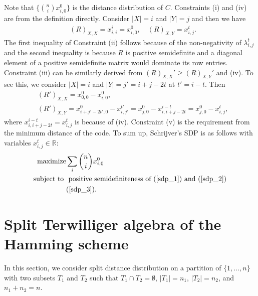 \documentclass[final,onecolumn]{IEEEtran}
\theoremstyle{definition}
\begin{document}
Note that $\{\binom{n}{i}x_{i, 0}^{0}\}$  is the distance distribution of $C$. Constraints (i) and (iv) are from the definition directly. Consider  $\lvert X \rvert = i$  and $\lvert Y \rvert = j$ and then we have
\begin{align*}
	&(R)_{X,X} = x_{i, i}^{i} = x_{i, 0}^{0}, \quad (R)_{X,Y} = x_{i, j}^{t}.
\end{align*}
The first inequality of Constraint  (ii) follows  because  of the non-negativity of $\lambda_{i,j}^t$ and the second inequality is because $R$ is positive semidefinite and a diagonal element of a positive semidefinite matrix would dominate its row entries.  Constraint (iii) can be similarly derived from $(R)_{X,X}'\geq (R)_{X,Y}'$ and (iv). To see this, we consider $\lvert X \rvert = i$ and $\lvert Y \rvert =j'= i+j-2t$ at $t'= i-t$. Then
\begin{align*}
	&  (R')_{X, X} = x_{0, 0}^{0} - x_{i, 0}^{0}, \\
	& (R')_{X, Y} = x_{i+j'-2t', 0}^{0} - x_{i, j'}^{t'}= x_{j, 0}^{0} - x_{i, i+j-2t}^{i-t}= x_{j, 0}^{0} - x_{i, j}^{t},
\end{align*}
where $x_{i, i+j-2t}^{i-t}=  x_{i, j}^{t}$ is because of (iv).
Constraint (v) is the requirement  from the minimum distance of the code. 
To sum up, Schrijver's  SDP is as follows with variables $ x_{i, j}^{t} \in\mathbb{R}$:
\begin{align}
	{\rm maximize}&\sum_{i}\binom{n}{i}x_{i, 0}^{0}  \notag\\
	{\rm subject\ to\ }       &  \mbox{ positive semidefiniteness of }(\ref{sdp_1}) \mbox{ and } (\ref{sdp_2})\notag\\
	&(\ref{sdp_3}).    \notag
\end{align}
	
\section{Split Terwilliger algebra of the Hamming scheme} \label{sec:split}
In this section, we consider split distance distribution on a partition of $\{1, \dots, n\}$ with two subsets $T_{1}$ and $T_{2}$ such that $T_{1}\cap T_{2}=\emptyset$, $\lvert T_{1}\rvert = n_{1}$,  $\lvert T_{2}\rvert = n_{2}$, and $n_1+n_2=n$. 
	
\end{document}
